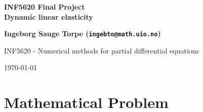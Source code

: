 \documentclass[twoside]{article}
\begin{document}





\begin{center}
{\LARGE\bf INF5620 Final Project}\\
{\LARGE\bf Dynamic linear elasticity}
\end{center}

\begin{center}
{\bf Ingeborg Sauge Torpe (\texttt{ingebto@math.uio.no})} \\ [3mm]
\centerline{INF5620 - Numerical methods for partial differential equations}
\end{center}



\begin{center}
\today
\end{center}

\vspace{1cm}



\begin{abstract}
This report investigates the dynamic linear elasticity equations using finite differences in time and finite element method in space.
We start by looking at a homogeneous medium, and moves on to look at a heterogeneous medium. 


\end{abstract}

\tableofcontents

\section{Mathematical Problem}
\label{mathproblem}
\end{document}
